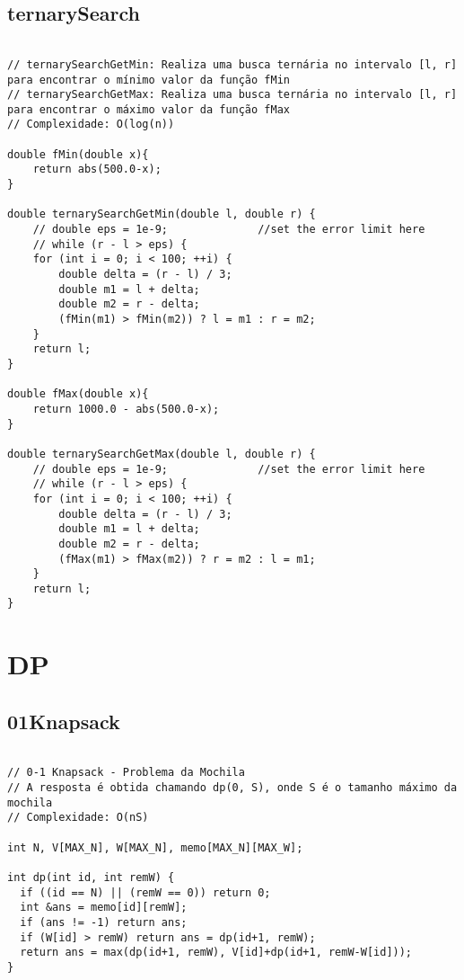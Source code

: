 \documentclass[landscape,twocolumn,10pt,a4paper]{article}
\begin{document}
\subsection{ternarySearch}
\begin{verbatim}

// ternarySearchGetMin: Realiza uma busca ternária no intervalo [l, r] para encontrar o mínimo valor da função fMin
// ternarySearchGetMax: Realiza uma busca ternária no intervalo [l, r] para encontrar o máximo valor da função fMax
// Complexidade: O(log(n))

double fMin(double x){
    return abs(500.0-x);
}

double ternarySearchGetMin(double l, double r) {
    // double eps = 1e-9;              //set the error limit here
    // while (r - l > eps) {
    for (int i = 0; i < 100; ++i) {
        double delta = (r - l) / 3;
        double m1 = l + delta;
        double m2 = r - delta;
        (fMin(m1) > fMin(m2)) ? l = m1 : r = m2;
    }
    return l;
}

double fMax(double x){
    return 1000.0 - abs(500.0-x);
}

double ternarySearchGetMax(double l, double r) {
    // double eps = 1e-9;              //set the error limit here
    // while (r - l > eps) {
    for (int i = 0; i < 100; ++i) {
        double delta = (r - l) / 3;
        double m1 = l + delta;
        double m2 = r - delta;
        (fMax(m1) > fMax(m2)) ? r = m2 : l = m1;
    }
    return l;
}

\end{verbatim}

\section{DP}
\subsection{01Knapsack}
\begin{verbatim}

// 0-1 Knapsack - Problema da Mochila
// A resposta é obtida chamando dp(0, S), onde S é o tamanho máximo da mochila
// Complexidade: O(nS)

int N, V[MAX_N], W[MAX_N], memo[MAX_N][MAX_W];

int dp(int id, int remW) {
  if ((id == N) || (remW == 0)) return 0;
  int &ans = memo[id][remW];
  if (ans != -1) return ans;
  if (W[id] > remW) return ans = dp(id+1, remW);
  return ans = max(dp(id+1, remW), V[id]+dp(id+1, remW-W[id]));
}

\end{verbatim}
\end{document}
